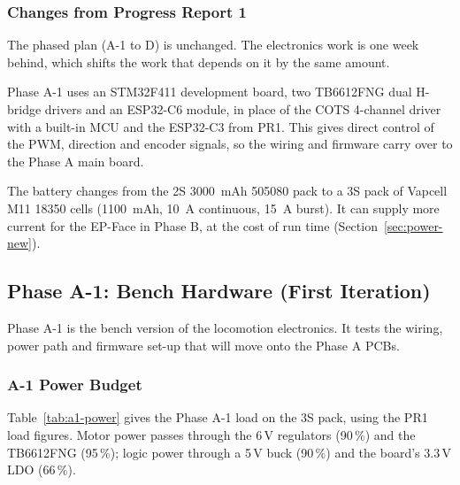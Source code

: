 \documentclass[12pt,a4paper]{article}
\begin{document}
\subsubsection{Changes from Progress Report 1}
\label{sec:elec-changes}

The phased plan (A-1 to D) is unchanged. The electronics work is one week
behind, which shifts the work that depends on it by the same amount.

Phase A-1 uses an STM32F411 development board, two TB6612FNG dual H-bridge
drivers and an ESP32-C6 module, in place of the COTS 4-channel driver with a
built-in MCU and the ESP32-C3 from PR1. This gives direct control of the PWM,
direction and encoder signals, so the wiring and firmware carry over to the
Phase A main board.

The battery changes from the 2S \SI{3000}{mAh} 505080 pack to a 3S pack of
Vapcell M11 18350 cells (\SI{1100}{mAh}, \SI{10}{A} continuous, \SI{15}{A}
burst). It can supply more current for the EP-Face in Phase B, at the cost of
run time (Section~\ref{sec:power-new}).

\subsection{Phase A-1: Bench Hardware (First Iteration)}
\label{sec:phase-a1-hw}

Phase A-1 is the bench version of the locomotion electronics. It tests the
wiring, power path and firmware set-up that will move onto the Phase A PCBs.

\subsubsection{A-1 Power Budget}

Table~\ref{tab:a1-power} gives the Phase A-1 load on the 3S pack, using the
PR1 load figures. Motor power passes through the 6\,V regulators (90\,\%) and
the TB6612FNG (95\,\%); logic power through a 5\,V buck (90\,\%) and the
board's 3.3\,V LDO (66\,\%).
\end{document}
